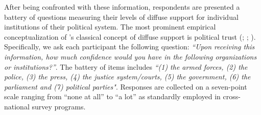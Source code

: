\documentclass[11pt, ngerman,english,a4]{article}
\begin{document}
After being confronted with these information, respondents are presented a battery of questions measuring their levels of diffuse support for individual institutions of their political system. The most prominent empirical conceptualization of \citet{Easton1975}'s classical concept of diffuse support  is political trust (\citealt{Hooghe2012}; \citealt{Schneider2017}; \citealt{Frye2019}). Specifically, we ask each participant the following question: \textit{“Upon receiving this information, how much confidence would you have in the following organizations or institutions?”}. The battery of items includes \textit{“(1) the armed forces, (2) the police, (3) the press, (4) the justice system/courts, (5) the government, (6) the parliament and (7) political parties"}. Responses are collected on a seven-point scale ranging from “none at all” to “a lot” as standardly employed in cross-national survey programs. 
\end{document}
